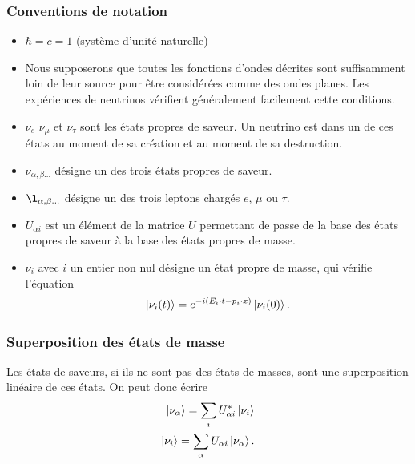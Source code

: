             \subsubsection{Conventions de notation}
            \begin{itemize}
                \item $\hbar = c = 1$ (système d'unité naturelle)
                \item Nous supposerons que toutes les fonctions d'ondes décrites sont suffisamment loin de leur source pour être considérées comme des ondes planes. Les expériences de neutrinos vérifient généralement facilement cette conditions.
                \item $\nu_e$ $\nu_{\mu}$ et $\nu_{\tau}$ sont les états propres de saveur. Un neutrino est dans un de ces états au moment de sa création et au moment de sa destruction.
                \item $\nu_{\alpha,\beta...}$ désigne un des trois états propres de saveur.
                \item $\l_{\alpha,\beta...}$ désigne un des trois leptons chargés $e$, $\mu$ ou $\tau$.
                \item $U_{\alpha i}$ est un élément de la matrice $U$ permettant de passe de la base des états propres de saveur à la base des états propres de masse.
                \item $\nu_{i}$ avec $i$ un entier non nul désigne un état propre de masse, qui vérifie l'équation
                \begin{equation}
                    \ket{\nu_i(t)} = e^{-i(E_i\cdot t - p_i\cdot x)}\ket{\nu_i(0)}.
                \end{equation}
            \end{itemize}
            
            \subsubsection{Superposition des états de masse}
            Les états de saveurs, si ils ne sont pas des états de masses, sont une superposition linéaire de ces états. On peut donc écrire
            \begin{eqnarray}
            \ket{\nu_{\alpha}} = \sum_i U_{\alpha i}^*\ket{\nu_i} \label{eq::alphatoi} \\
            \ket{\nu_i} = \sum_{\alpha} U_{\alpha i}\ket{\nu_{\alpha}}.
            \end{eqnarray}
            
